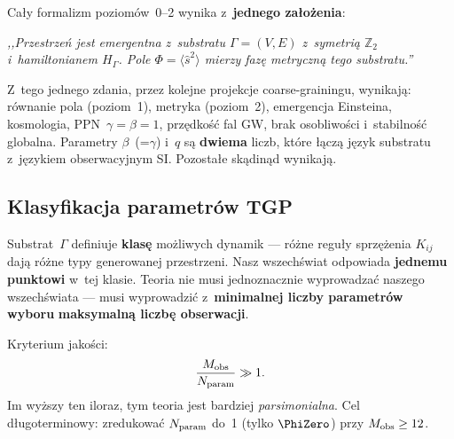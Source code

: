\begin{remark}\label{rem:minimalna-zasada}
Ca\l{}y formalizm poziom\'ow~0--2 wynika z~\textbf{jednego za\l{}o\.zenia}:
\begin{center}
\textit{,,Przestrze\'n jest emergentna z~substratu $\Gamma=(V,E)$
z~symetri\k{a} $\mathbb{Z}_2$ i~hamiltonianem $H_\Gamma$.
Pole $\Phi = \langle\hat{s}^2\rangle$ mierzy faz\k{e} metryczn\k{a}
tego substratu.''}
\end{center}
Z~tego jednego zdania, przez kolejne projekcje coarse-grainingu,
wynikaj\k{a}: r\'ownanie pola (poziom~1), metryka (poziom~2),
emergencja Einsteina, kosmologia, PPN~$\gamma=\beta=1$,
prz\k{e}dko\'s\'c fal GW, brak osobliwo\'sci i~stabilno\'s\'c globalna.
Parametry $\beta$~(=$\gamma$) i~$q$ s\k{a} \textbf{dwiema} liczb,
kt\'ore \l{}\k{a}cz\k{a} j\k{e}zyk substratu z~j\k{e}zykiem obserwacyjnym
SI. Pozosta\l{}e sk\k{a}din\k{a}d wynikaj\k{a}.
\end{remark}

\subsection{Klasyfikacja parametr\'ow TGP}\label{ssec:param-classification}

\begin{remark}%
\label{rem:multiverse-philosophy}
Substrat~$\Gamma$ definiuje \textbf{klas\k{e}} mo\.zliwych dynamik ---
r\'o\.zne regu\l{}y sprz\k{e}\.zenia $K_{ij}$ daj\k{a} r\'o\.zne typy
generowanej przestrzeni. Nasz wszech\'swiat odpowiada
\textbf{jednemu punktowi} w~tej klasie.
Teoria nie musi jednoznacznie wyprowadza\'c naszego wszech\'swiata
--- musi wyprowadzi\'c z~\textbf{minimalnej liczby parametr\'ow wyboru}
\textbf{maksymaln\k{a} liczb\k{e} obserwacji}.

Kryterium jako\'sci:
\[
  \frac{M_{\rm obs}}{N_{\rm param}} \gg 1.
\]
Im wy\.zszy ten iloraz, tym teoria jest bardziej \emph{parsimonialna}.
Cel d\l{}ugoterminowy: zredukowa\'c $N_{\rm param}$ do~1
(tylko $\PhiZero$) przy $M_{\rm obs} \geq 12$.
\end{remark}

